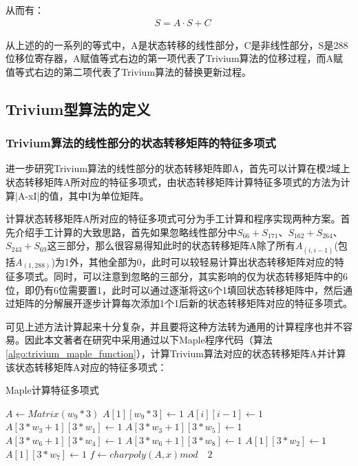 从而有：
\begin{align}
\label{eq:struct}
& S = A \cdot S + C
\end{align}

从上述的的一系列的等式中，A是状态转移的线性部分，C是非线性部分，S是288位移位寄存器，A赋值等式右边的第一项代表了Trivium算法的位移过程，而A赋值等式右边的第二项代表了Trivium算法的替换更新过程。

\subsection{Trivium型算法的定义}

\subsubsection{Trivium算法的线性部分的状态转移矩阵的特征多项式}

进一步研究Trivium算法的线性部分的状态转移矩阵即A，首先可以计算在模2域上状态转移矩阵A所对应的特征多项式，由状态转移矩阵计算特征多项式的方法为计算|A-xI|的值，其中I为单位矩阵。

计算状态转移矩阵A所对应的特征多项式可分为手工计算和程序实现两种方案。首先介绍手工计算的大致思路，首先如果忽略线性部分中$S_{66} + S_{171}$、$S_{162} + S_{264}$、$S_{243} + S_{69}$这三部分，那么很容易得知此时的状态转移矩阵A除了所有$A_{(i,i-1)}$(包括$A_{(1,288)}$)为1外，其他全部为0，此时可以较轻易计算出状态转移矩阵对应的特征多项式。同时，可以注意到忽略的三部分，其实影响的仅为状态转移矩阵中的6位，即仍有6位需要置1，此时可以通过逐渐将这6个1填回状态转移矩阵中，然后通过矩阵的分解展开逐步计算每次添加1个1后新的状态转移矩阵对应的特征多项式。

可见上述方法计算起来十分复杂，并且要将这种方法转为通用的计算程序也并不容易。因此本文著者在研究中采用通过以下Maple程序代码（算法\ref{algo:trivium_maple_function}），计算Trivium算法对应的状态转移矩阵A并计算该状态转移矩阵A对应的特征多项式：

\begin{algorithm}[H]
  \caption{Maple计算特征多项式}
  \label{algo:trivium_maple_function}
  \begin{algorithmic}
      
	  \STATE $A \leftarrow Matrix(w_{9}*3)$
	  \STATE $A[1][w_{9}*3] \leftarrow 1$
	    \STATE $A[i][i - 1] \leftarrow 1$
	  \ENDFOR 
	  \STATE $A[3*w_{3}+1][3*w_{1}] \leftarrow 1$
	  \STATE $A[3*w_{3}+1][3*w_{5}] \leftarrow 1$
	  \STATE $A[3*w_{6}+1][3*w_{4}] \leftarrow 1$
	  \STATE $A[3*w_{6}+1][3*w_{8}] \leftarrow 1$
	  \STATE $A[1][3*w_{2}] \leftarrow 1$
	  \STATE $A[1][3*w_{7}] \leftarrow 1$
	  \STATE $f \leftarrow charpoly(A, x) mod \quad 2$

  \end{algorithmic}
\end{algorithm}

